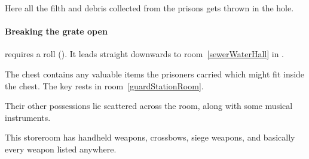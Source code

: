 \begin{multicols}{2}
\label{spyBroth}


Here all the filth and debris collected from the prisons gets thrown in the hole.

\paragraph{Breaking the grate open}
requires a  roll (\tn[10]).
It leads straight downwards to room~\vref{sewerWaterHall} in .


The chest contains any valuable items the prisoners carried which might fit inside the chest.
The key rests in room~\ref{guardStationRoom}.

Their other possessions lie scattered across the room, along with some musical instruments.


This storeroom has handheld weapons, \glspl{crossbow}, siege weapons, and basically every weapon listed anywhere.%

\end{multicols}
